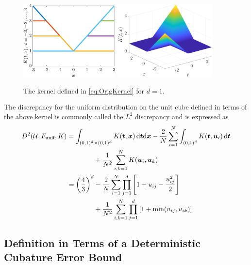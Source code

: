 \documentclass[graybox]{svmult}
\newcommand{\vx}{\boldsymbol{x}}
\newcommand{\vt}{\boldsymbol{t}}
\newcommand{\vu}{\boldsymbol{u}}
\newcommand{\dif}{{\rm d}}
\newcommand{\Udes}{\mathcal{U}}
\newcommand{\unif}{\textup{unif}}
\begin{document}
\begin{figure}
    \centering
    \includegraphics[height = 4cm]{KernelPict.eps} \qquad
    \includegraphics[height = 4cm]{Kernel3DPict.eps}
    \caption{The kernel defined in \eqref{eq:OrigKernel} for $d=1$.}
    \label{fig:kernelpict}
\end{figure}

The discrepancy for the uniform distribution on the unit cube defined in terms of the above kernel is commonly called the $L^2$ discrepancy and is expressed as
\begin{align} 
\nonumber
    D^2(\Udes,F_\unif,K)
    & = \int_{(0,1)^d \times (0,1)^d} K(\vt,\vx) \, \dif \vt \dif \vx - \frac 2N \sum_{i=1}^N \int_{(0,1)^d} K(\vt,\vu_i) \, \dif \vt\\
    \nonumber
    & \qquad \qquad  + \frac{1}{N^2} \sum_{i,k=1}^N K(\vu_i,\vu_k) \\
    \nonumber
    & = \left( \frac 43 \right)^d 
     - \frac 2N \sum_{i=1}^N \prod_{j=1}^d \left[1 + u_{ij} - \frac{u_{ij}^2}{2} \right] \\
     & \qquad \qquad + \frac 1{N^2} \sum_{i,k=1}^N \prod_{j=1}^d \left[1+ \min(u_{ij},u_{ik})\right]
\end{align}



\subsection{Definition in Terms of a Deterministic Cubature Error Bound}
\label{sec:DetermBound}
\end{document}
